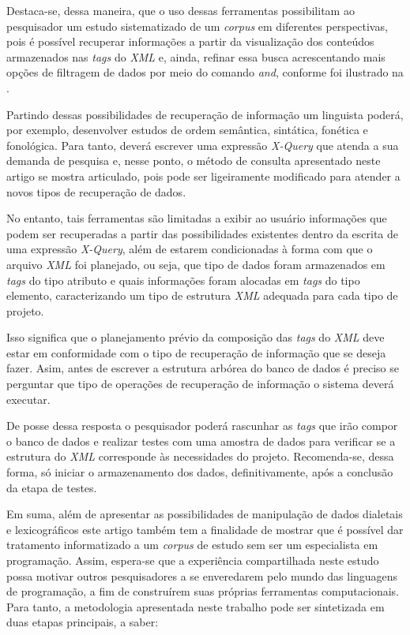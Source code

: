 \documentclass[portuguese]{textolivre}
\begin{document}
Destaca-se, dessa maneira, que o uso dessas ferramentas possibilitam ao pesquisador um estudo sistematizado de um \textit{corpus} em diferentes perspectivas, pois é possível recuperar informações a partir da visualização dos conteúdos armazenados nas \emph{tags} do \emph{XML} e, ainda, refinar essa busca acrescentando mais opções de filtragem de dados por meio do comando \emph{and}, conforme foi ilustrado na .

Partindo dessas possibilidades de recuperação de informação um linguista poderá, por exemplo, desenvolver estudos de ordem semântica, sintática, fonética e fonológica. Para tanto, deverá escrever uma expressão \emph{X-Query} que atenda a sua demanda de pesquisa e, nesse ponto, o método de consulta apresentado neste artigo se mostra articulado, pois pode ser ligeiramente modificado para atender a novos tipos de recuperação de dados.

No entanto, tais ferramentas são limitadas a exibir ao usuário informações que podem ser recuperadas a partir das possibilidades existentes dentro da escrita de uma expressão \emph{X-Query}, além de estarem condicionadas à forma com que o arquivo \emph{XML} foi planejado, ou seja, que tipo de dados foram armazenados em \emph{tags} do tipo atributo e quais informações foram alocadas em \emph{tags} do tipo elemento, caracterizando um tipo de estrutura \emph{XML} adequada para cada tipo de projeto.

Isso significa que o planejamento prévio da composição das \emph{tags} do \emph{XML} deve estar em conformidade com o tipo de recuperação de informação que se deseja fazer. Asim, antes de escrever a estrutura arbórea do banco de dados é preciso se perguntar  que tipo de operações de recuperação de informação o sistema deverá executar. 

De posse dessa resposta o pesquisador poderá rascunhar as \emph{tags} que irão compor o banco de dados e realizar testes com uma amostra de dados para verificar se a estrutura do \emph{XML} corresponde às necessidades do projeto. Recomenda-se, dessa forma, só iniciar o armazenamento dos dados, definitivamente, após a conclusão da etapa de testes.

Em suma, além de apresentar as possibilidades de manipulação de dados  dialetais e lexicográficos este artigo também tem a finalidade de mostrar que é possível dar tratamento informatizado a um \emph{corpus} de estudo sem ser um especialista em programação. Assim, espera-se que a experiência compartilhada neste estudo possa motivar outros pesquisadores a se enveredarem pelo mundo das linguagens de programação, a fim de construírem suas próprias ferramentas computacionais. Para tanto, a metodologia apresentada neste trabalho pode ser sintetizada em duas etapas principais, a saber:
\end{document}

